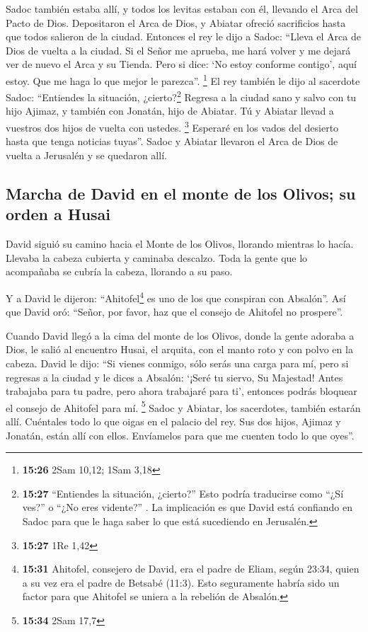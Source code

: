  Sadoc también estaba allí, y todos los levitas estaban
con él, llevando el Arca del Pacto de Dios. Depositaron el Arca de Dios,
y Abiatar ofreció sacrificios hasta que todos salieron de la ciudad.
 Entonces el rey le dijo a Sadoc: ``Lleva el Arca de Dios
de vuelta a la ciudad. Si el Señor me aprueba, me hará volver y me
dejará ver de nuevo el Arca y su Tienda.  Pero si dice:
`No estoy conforme contigo', aquí estoy. Que me haga lo que mejor le
parezca''. \footnote{\textbf{15:26} 2Sam 10,12; 1Sam 3,18}
 El rey también le dijo al sacerdote Sadoc: ``Entiendes
la situación, ¿cierto?\footnote{\textbf{15:27} ``Entiendes la situación,
  ¿cierto?'' Esto podría traducirse como ``¿Sí ves?'' o ``¿No eres
  vidente?'' . La implicación es que David está confiando en Sadoc para
  que le haga saber lo que está sucediendo en Jerusalén.} Regresa a la
ciudad sano y salvo con tu hijo Ajimaz, y también con Jonatán, hijo de
Abiatar. Tú y Abiatar llevad a vuestros dos hijos de vuelta con ustedes.
\footnote{\textbf{15:27} 1Re 1,42}  Esperaré en los vados
del desierto hasta que tenga noticias tuyas''.  Sadoc y
Abiatar llevaron el Arca de Dios de vuelta a Jerusalén y se quedaron
allí.

\hypertarget{marcha-de-david-en-el-monte-de-los-olivos-su-orden-a-husai}{%
\subsection{Marcha de David en el monte de los Olivos; su orden a
Husai}\label{marcha-de-david-en-el-monte-de-los-olivos-su-orden-a-husai}}

 David siguió su camino hacia el Monte de los Olivos,
llorando mientras lo hacía. Llevaba la cabeza cubierta y caminaba
descalzo. Toda la gente que lo acompañaba se cubría la cabeza, llorando
a su paso.

 Y a David le dijeron: ``Ahitofel\footnote{\textbf{15:31}
  Ahitofel, consejero de David, era el padre de Eliam, según 23:34,
  quien a su vez era el padre de Betsabé (11:3). Esto seguramente habría
  sido un factor para que Ahitofel se uniera a la rebelión de Absalón.}
es uno de los que conspiran con Absalón''. Así que David oró: ``Señor,
por favor, haz que el consejo de Ahitofel no prospere''.

 Cuando David llegó a la cima del monte de los Olivos,
donde la gente adoraba a Dios, le salió al encuentro Husai, el arquita,
con el manto roto y con polvo en la cabeza.  David le
dijo: ``Si vienes conmigo, sólo serás una carga para mí, 
pero si regresas a la ciudad y le dices a Absalón: `¡Seré tu siervo, Su
Majestad! Antes trabajaba para tu padre, pero ahora trabajaré para ti',
entonces podrás bloquear el consejo de Ahitofel para mí. \footnote{\textbf{15:34}
  2Sam 17,7}  Sadoc y Abiatar, los sacerdotes, también
estarán allí. Cuéntales todo lo que oigas en el palacio del rey.
 Sus dos hijos, Ajimaz y Jonatán, están allí con ellos.
Envíamelos para que me cuenten todo lo que oyes''.

